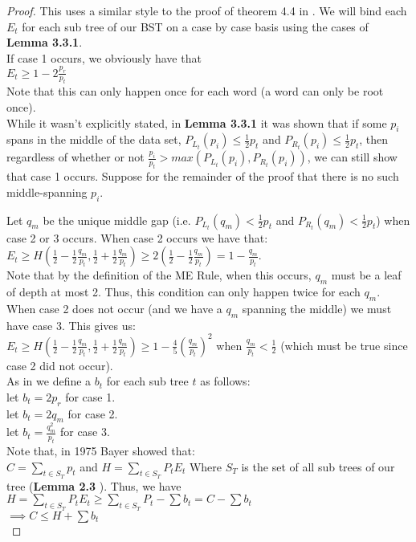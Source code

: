 \documentclass[letterpaper,12pt,titlepage,oneside,final]{book}
\theoremstyle{plain}
\begin{document}
\begin{proof}
This uses a similar style to the proof of theorem 4.4 in \cite{bayer1975improved}.
We will bind each $E_t$ for each sub tree of our BST on a case by case basis using the cases of \textbf{Lemma 3.3.1}.\\
If case 1 occurs, we obviously have that \\
$E_t \geq 1-2 \frac{p_r}{p_t}$ \\
Note that this can only happen once for each word (a word can only be root once). \\

While it wasn't explicitly stated, in \textbf{Lemma 3.3.1} it was shown that if some $p_i$ spans in the middle of the data set, $P_{L_t}(p_i) \leq \frac{1}{2}p_t$ and $P_{R_t}(p_i) \leq \frac{1}{2}p_t$, then regardless of whether or not $\frac{p_i}{p_t} > max(P_{L_t}(p_i), P_{R_t}(p_i))$, we can still show that case 1 occurs. Suppose for the remainder of the proof that there is no such middle-spanning $p_i$.

Let $q_m$ be the unique middle gap (i.e. $P_{L_t}(q_m) < \frac{1}{2} p_t$ and $P_{R_t}(q_m) < \frac{1}{2} p_t$) when case 2 or 3 occurs. When case 2 occurs we have that: \\
$E_t \geq H(\frac{1}{2}-\frac{1}{2} \frac{q_m}{p_t}, \frac{1}{2} + \frac{1}{2} \frac{q_m}{p_t}) \geq 2(\frac{1}{2}-\frac{1}{2} \frac{q_m}{p_t})=1-\frac{q_m}{p_t}$. \\
Note that by the definition of the ME Rule, when this occurs, $q_m$ must be a leaf of depth at most 2. Thus, this condition can only happen twice for each $q_m$. \\

When case 2 does not occur (and we have a $q_m$ spanning the middle) we must have case 3. This gives us: \\
$E_t \geq H(\frac{1}{2}-\frac{1}{2} \frac{q_m}{p_t}, \frac{1}{2} + \frac{1}{2} \frac{q_m}{p_t}) \geq 1- \frac{4}{5} (\frac{q_m}{p_t})^2$ when $\frac{q_m}{p_t} < \frac{1}{2}$ (which must be true since case 2 did not occur). \\

\iffalse
TODO PROVE THIS DERIVATIVE
derivative of (0.5-0.5*q)*log_2(1/(0.5-0.5*q)) + (0.5+0.5*q)*log_2(1/(0.5+0.5*q)) - (1-(4/5)*(q^2))
\fi

As in \cite{bayer1975improved} we define a $b_t$ for each sub tree $t$ as follows: \\
let $b_t=2p_r$ for case 1. \\
let $b_t=2q_m$ for case 2. \\
let $b_t=\frac{q_m^2}{p_t}$ for case 3. \\
Note that, in 1975 Bayer showed that: \\
$C = \sum_{t \in S_T} p_t$ and $H = \sum_{t \in S_T} P_t E_t $ Where $S_T$ is the set of all sub trees of our tree (\textbf{Lemma 2.3} \cite{bayer1975improved}).
Thus, we have\\
$H = \sum_{t \in S_T} P_t E_t \geq \sum_{t \in S_T} P_t - \sum b_t = C - \sum b_t$ \\
$ \implies C \leq H + \sum b_t$ \\


\end{proof}
\end{document}

